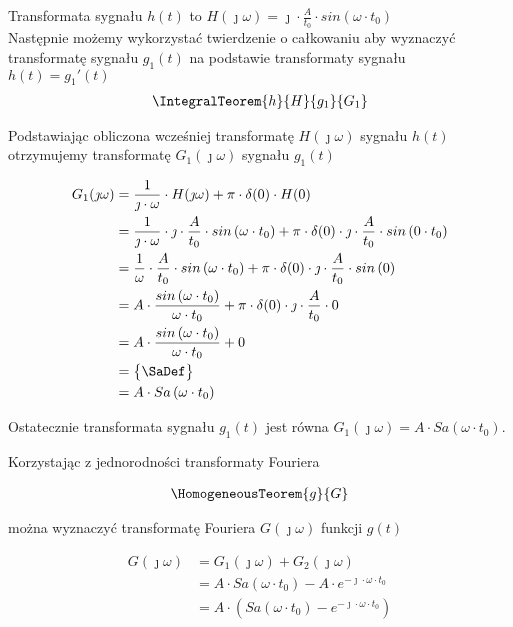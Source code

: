 \begin{task}
Transformata sygnału $h(t)$ to $H(\jmath \omega)=\jmath \cdot \frac{A}{t_0} \cdot sin\left( \omega \cdot t_0\right)$
\\

Następnie możemy wykorzystać twierdzenie o całkowaniu aby wyznaczyć transformatę sygnału $g_1(t)$ na podstawie transformaty sygnału $h(t)=g_1'(t)$
\begin{align*}
\IntegralTeorem{h}{H}{g_1}{G_1}
\end{align*}

Podstawiając obliczona wcześniej transformatę $H(\jmath \omega)$ sygnału $h(t)$ otrzymujemy transformatę $G_1(\jmath \omega)$ sygnału $g_1(t)$

\begin{align*}
G_1(\jmath \omega) &= \frac{1}{\jmath \cdot \omega} \cdot H(\jmath \omega) + \pi \cdot \delta(0) \cdot H(0)\\
&=\frac{1}{\jmath \cdot \omega} \cdot \jmath \cdot \frac{A}{t_0} \cdot sin\left( \omega \cdot t_0\right) + \pi \cdot \delta(0) \cdot \jmath \cdot \frac{A}{t_0} \cdot sin\left( 0 \cdot t_0\right)\\
&=\frac{1}{\omega} \cdot \frac{A}{t_0}\cdot sin\left( \omega \cdot t_0\right) + \pi \cdot \delta(0) \cdot \jmath \cdot \frac{A}{t_0} \cdot sin\left( 0\right)\\
&= A \cdot \frac{sin\left( \omega \cdot t_0\right)}{\omega \cdot t_0} + \pi \cdot \delta(0) \cdot \jmath \cdot \frac{A}{t_0} \cdot 0\\
&= A \cdot \frac{sin\left( \omega \cdot t_0\right)}{\omega \cdot t_0} + 0\\
&=\begin{Bmatrix}
\SaDef
\end{Bmatrix}\\
&=A \cdot Sa\left( \omega \cdot t_0\right)\\
\end{align*}

Ostatecznie transformata sygnału $g_1(t)$ jest równa $G_1(\jmath \omega)=A \cdot Sa\left( \omega \cdot t_0\right)$.

Korzystając z jednorodności transformaty Fouriera 

\begin{align*}
\HomogeneousTeorem{g}{G}
\end{align*}

można wyznaczyć transformatę Fouriera $G(\jmath \omega)$ funkcji $g(t)$

\begin{align*}
G(\jmath \omega) &= G_1(\jmath \omega)+G_2(\jmath \omega)\\
&= A \cdot Sa\left( \omega \cdot t_0\right) -A \cdot e^{-\jmath \cdot \omega \cdot t_0}\\
&= A \cdot \left( Sa\left( \omega \cdot t_0\right) - e^{-\jmath \cdot \omega \cdot t_0} \right)\\
\end{align*}


\end{task}
